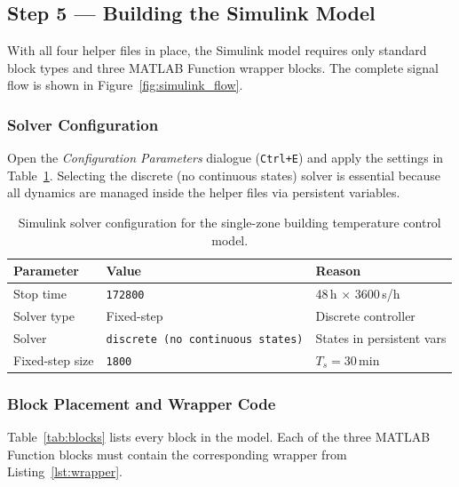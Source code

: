 \subsection{Step 5 — Building the Simulink Model}
\label{subsec:slx}

With all four helper files in place, the Simulink model requires only
standard block types and three MATLAB Function wrapper blocks.  The
complete signal flow is shown in Figure~\ref{fig:simulink_flow}.

\subsubsection{Solver Configuration}

Open the \textit{Configuration Parameters} dialogue (\texttt{Ctrl+E})
and apply the settings in Table~\ref{tab:solver}.  Selecting the
discrete (no continuous states) solver is essential because all
dynamics are managed inside the helper files via persistent variables.

\begin{table}[htbp]
	\centering
	\caption{Simulink solver configuration for the single-zone building
		temperature control model.}
	\label{tab:solver}
	\begin{tabular}{lll}
		\toprule
		\textbf{Parameter} & \textbf{Value} & \textbf{Reason} \\
		\midrule
		Stop time       & \texttt{172800}  & 48\,h $\times$ 3600\,s/h \\
		Solver type     & Fixed-step       & Discrete controller \\
		Solver          & \texttt{discrete (no continuous states)} & States in persistent vars \\
		Fixed-step size & \texttt{1800}    & $T_s = 30\,\mathrm{min}$ \\
		\bottomrule
	\end{tabular}
\end{table}

\subsubsection{Block Placement and Wrapper Code}

Table~\ref{tab:blocks} lists every block in the model.  Each of the
three MATLAB Function blocks must contain the corresponding wrapper
from Listing~\ref{lst:wrapper}.

